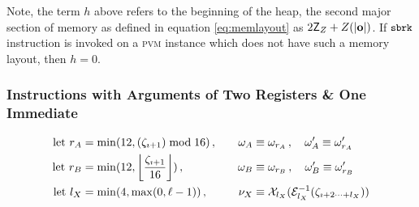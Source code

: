 Note, the term $h$ above refers to the beginning of the heap, the second major section of memory as defined in equation \ref{eq:memlayout} as $2\mathsf{Z}_Z + Z(|\mathbf{o}|)$. If $\text{{\small \texttt{sbrk}}}$ instruction is invoked on a \textsc{pvm} instance which does not have such a memory layout, then $h = 0$.

\subsubsection{Instructions with Arguments of Two Registers \& One Immediate}
\begin{equation}
\begin{aligned}
  \using r_A &= \min(12, (\instructions_{\imath+1}) \bmod 16) \,,\quad&
  \reg_A &\equiv \reg_{r_A} \,,\quad
  \reg'_A \equiv \reg'_{r_A} \\
  \using r_B &= \min(12, \ffrac{\instructions_{\imath+1}}{16}) \,,\quad&
  \reg_B &\equiv \reg_{r_B} \,,\quad
  \reg'_B \equiv \reg'_{r_B} \\
  \using l_X &= \min(4, \max(0, \ell - 1)) \,,\quad&
  \immed_X &\equiv \sext_{l_X}(\de_{l_X}(\instructions_{\imath+2\dots+l_X}))
\end{aligned}
\end{equation}

